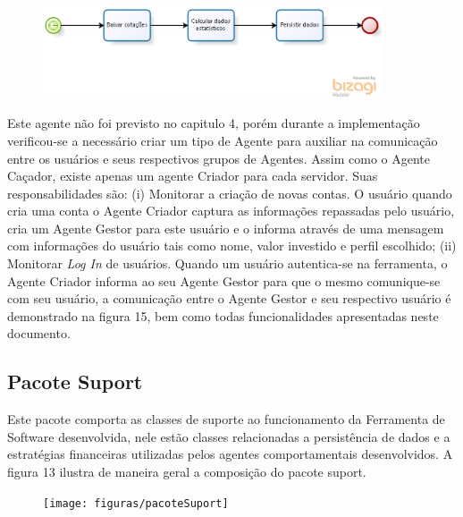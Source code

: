 \begin{apendicesenv}
\begin{figure}[h]
\centering
\label{f12}
\includegraphics[width=0.9\textwidth]{figuras/f44}
\end{figure}


Este agente não foi previsto no capitulo 4, porém durante a implementação verificou-se a necessário criar um tipo de Agente para auxiliar na comunicação entre os usuários e seus respectivos grupos de Agentes. Assim como o Agente Caçador, existe apenas um agente Criador para cada servidor. Suas responsabilidades são: (i) Monitorar a criação de novas contas. O usuário quando cria uma conta o Agente Criador captura as informações repassadas pelo usuário, cria um Agente Gestor para este usuário e o informa através de uma mensagem com informações do usuário tais como nome, valor investido e perfil escolhido; (ii) Monitorar \textit{Log In} de usuários.  Quando um usuário autentica-se na ferramenta, o Agente Criador informa ao seu Agente Gestor para que o mesmo comunique-se com seu usuário, a comunicação entre o Agente Gestor e seu respectivo usuário é demonstrado na figura 15, bem como todas funcionalidades apresentadas neste documento.

\subsection{Pacote Suport}

Este pacote comporta as classes de suporte ao funcionamento da Ferramenta de Software desenvolvida, nele estão classes relacionadas a persistência de dados e a estratégias financeiras utilizadas pelos agentes comportamentais desenvolvidos. A figura 13 ilustra de maneira geral a composição do pacote suport. 

\begin{figure}[h]
\centering
\label{f13}
\texttt{[image: figuras/pacoteSuport]}
\end{figure}


\end{apendicesenv}
